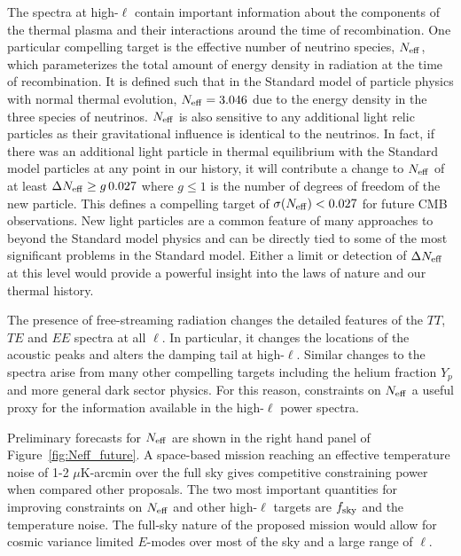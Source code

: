 The spectra at high-$\ell$ contain important information about the components of the thermal plasma and their interactions around the time of recombination.  One particular compelling target is the effective number of neutrino species, ${N_{\rm eff}}$, which parameterizes the total amount of energy density in radiation at the time of recombination.  It is defined such that in the Standard model of particle physics with normal thermal evolution, ${N_{\rm eff}} = 3.046$ due to the energy density in the three species of neutrinos.  ${N_{\rm eff}}$ is also sensitive to any additional light relic particles as their gravitational influence is identical to the neutrinos.  In fact, if there was an additional light particle in thermal equilibrium with the Standard model particles at any point in our history, it will contribute a change to ${N_{\rm eff}}$ of at least $\Delta {N_{\rm eff}} \geq g \, 0.027$ where $g \leq 1$ is the number of degrees of freedom of the new particle.  This defines a compelling target of $\sigma({N_{\rm eff}}) < 0.027$ for future CMB observations.  New light particles are a common feature of many approaches to beyond the Standard model physics and can be directly tied to some of the most significant problems in the Standard model.  Either a limit or detection of $\Delta {N_{\rm eff}}$ at this level would provide a powerful insight into the laws of nature and our thermal history. 

The presence of free-streaming radiation changes the detailed features of the $TT$, $TE$ and $EE$ spectra at all $\ell$.  In particular, it changes the locations of the acoustic peaks and alters the damping tail at high-$\ell$.  Similar changes to the spectra arise from many other compelling targets including the helium fraction $Y_p$ and more general dark sector physics.  For this reason, constraints on ${N_{\rm eff}}$ a useful proxy for the information available in the high-$\ell$ power spectra.  

Preliminary forecasts for ${N_{\rm eff}}$ are shown in the right hand panel of Figure~\ref{fig:Neff_future}.  A space-based mission reaching an effective temperature noise of 1-2 $\mu$K-arcmin over the full sky gives competitive constraining power when compared other proposals.  The two most important quantities for improving constraints on ${N_{\rm eff}}$ and other high-$\ell$ targets are $f_{\rm sky}$ and the temperature noise.  The full-sky nature of the proposed mission would allow for cosmic variance limited $E$-modes over most of the sky and a large range of $\ell$.

